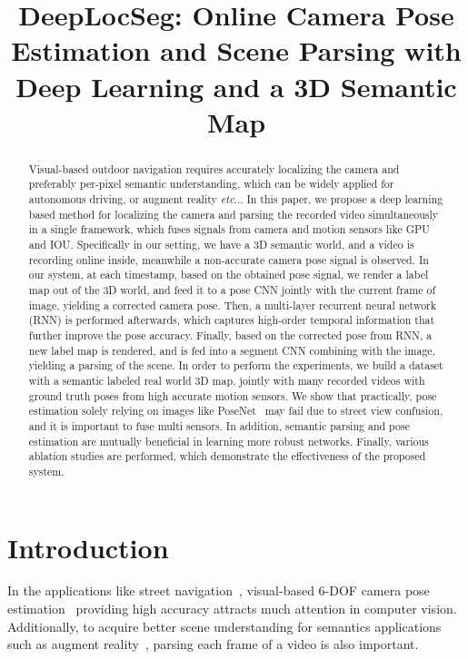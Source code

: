 \documentclass[10pt,twocolumn,letterpaper]{article}
\makeatletter
\DeclareRobustCommand\onedot{\futurelet\@let@token\@onedot}
\def\onedot{\ifx\@let@token.\else.\null\fi\xspace}
\def\eg{\emph{e.g.}}
\def\etc{\emph{etc}\onedot}
\makeatother
\begin{document}
\title{DeepLocSeg: Online Camera Pose Estimation and Scene Parsing with Deep Learning and a 3D Semantic Map}

\maketitle

\begin{abstract}
Visual-based outdoor navigation requires accurately localizing the camera and preferably per-pixel semantic understanding, which can be widely applied for autonomous driving, or augment reality \etc.
In this paper, we propose a deep learning based method for localizing the camera and parsing the recorded video simultaneously in a single framework, which fuses signals from camera and motion sensors like GPU and IOU.
Specifically in our setting, we have a 3D semantic world, and a video is recording online inside, meanwhile a non-accurate camera pose signal is observed. 
In our system, at each timestamp, based on the obtained pose signal, we render a label map out of the 3D world, and feed it to a pose CNN jointly with the current frame of image, yielding a corrected camera pose. 
Then, a multi-layer recurrent neural network (RNN) is performed afterwards, which captures high-order temporal information that further improve the pose accuracy. 
Finally, based on the corrected pose from RNN, a new label map is rendered, and is fed into a segment CNN combining with the image, yielding a parsing of the scene.
In order to perform the experiments,  we build a dataset with a semantic labeled real world 3D map, jointly with many recorded videos with ground truth poses from high accurate motion sensors. 
We show that practically, pose estimation solely relying on images like PoseNet~\cite{Kendall_2015_ICCV} may fail due to street view confusion, and it is important to fuse multi sensors. In addition, semantic parsing and pose estimation are mutually beneficial in learning more robust networks. Finally, various ablation studies are performed, which demonstrate the effectiveness of the proposed system.
\end{abstract}

\section{Introduction}
\label{sec:introduction}
In the applications like street navigation~\cite{ohno2003outdoor}, visual-based 6-DOF camera pose estimation~\cite{campbell2017globally,moreno2008pose,Kendall_2015_ICCV,coskun2017long} providing high accuracy attracts much attention in computer vision. 
Additionally, to acquire better scene understanding for semantics applications such as augment reality~\cite{DBLP:journals/corr/abs-1708-05006}, parsing each frame of a video is also important. 
\end{document}
